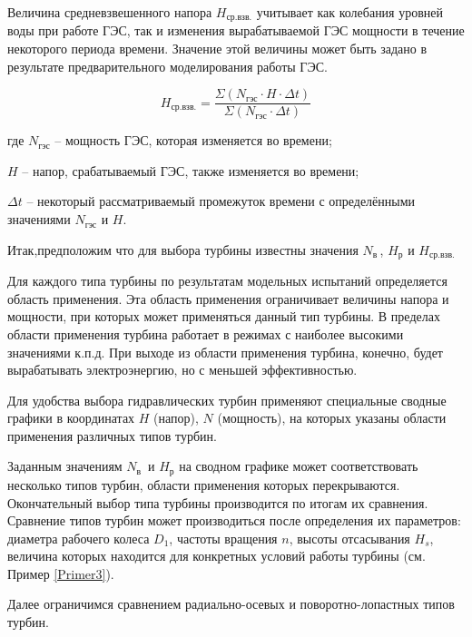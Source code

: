 Величина средневзвешенного напора $H_{\text{ср.взв.}}$ учитывает как колебания уровней воды при работе ГЭС, так и изменения вырабатываемой ГЭС мощности в течение некоторого периода времени. Значение этой величины может быть задано в результате предварительного моделирования работы ГЭС.

$$
   H_{\text{ср.взв.}} = \frac{ \Sigma \left( N_{\text{гэс}} \cdot H \cdot \Delta t \right)}{\Sigma \left( N_{\text{гэс}} \cdot \Delta t \right)}
$$

где $N_{\text{гэс}}$ -- мощность ГЭС, которая изменяется во времени;

$H$ -- напор, срабатываемый ГЭС, также изменяется во времени;

$\Delta t$ -- некоторый рассматриваемый промежуток времени с определёнными значениями $N_{\text{гэс}}$ и $H$.

\vspace{0.5cm}

Итак,предположим что для выбора турбины известны значения $N_{\text{в}} \,$, $H_{\text{р}}$ и $H_{\text{ср.взв.}}$



\vspace{1cm}

Для каждого типа турбины по результатам модельных испытаний определяется область применения. Эта область применения ограничивает величины напора и мощности, при которых может применяться данный тип турбины. В пределах области применения турбина работает в режимах с наиболее высокими значениями к.п.д. При выходе из области применения турбина, конечно, будет вырабатывать электроэнергию, но с меньшей эффективностью.

Для удобства выбора гидравлических турбин применяют специальные сводные графики в координатах $H$ (напор), $N$ (мощность), на которых указаны области применения различных типов турбин.

Заданным значениям $N_{\text{в}} \,$ и $H_{\text{р}}$ на сводном графике может соответствовать несколько типов турбин, области применения которых перекрываются. Окончательный выбор типа турбины производится по итогам их сравнения. Сравнение типов турбин может производиться после определения их параметров: диаметра рабочего колеса $D_1$, частоты вращения $n$, высоты отсасывания $H_s$, величина которых находится для конкретных условий работы турбины (см. Пример \ref{Primer3}).

Далее ограничимся сравнением радиально-осевых и поворотно-лопастных типов турбин.

